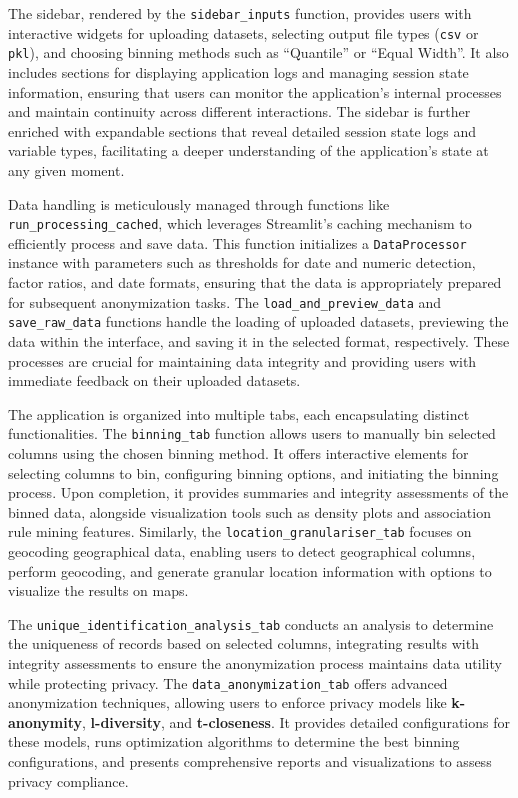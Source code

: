 \documentclass{article}
\begin{document}
The sidebar, rendered by the \texttt{sidebar\_inputs} function, provides users with interactive widgets for uploading datasets, selecting output file types (\texttt{csv} or \texttt{pkl}), and choosing binning methods such as ``Quantile'' or ``Equal Width''. It also includes sections for displaying application logs and managing session state information, ensuring that users can monitor the application's internal processes and maintain continuity across different interactions. The sidebar is further enriched with expandable sections that reveal detailed session state logs and variable types, facilitating a deeper understanding of the application's state at any given moment.

Data handling is meticulously managed through functions like \texttt{run\_processing\_cached}, which leverages Streamlit's caching mechanism to efficiently process and save data. This function initializes a \texttt{DataProcessor} instance with parameters such as thresholds for date and numeric detection, factor ratios, and date formats, ensuring that the data is appropriately prepared for subsequent anonymization tasks. The \texttt{load\_and\_preview\_data} and \texttt{save\_raw\_data} functions handle the loading of uploaded datasets, previewing the data within the interface, and saving it in the selected format, respectively. These processes are crucial for maintaining data integrity and providing users with immediate feedback on their uploaded datasets.

The application is organized into multiple tabs, each encapsulating distinct functionalities. The \texttt{binning\_tab} function allows users to manually bin selected columns using the chosen binning method. It offers interactive elements for selecting columns to bin, configuring binning options, and initiating the binning process. Upon completion, it provides summaries and integrity assessments of the binned data, alongside visualization tools such as density plots and association rule mining features. Similarly, the \texttt{location\_granulariser\_tab} focuses on geocoding geographical data, enabling users to detect geographical columns, perform geocoding, and generate granular location information with options to visualize the results on maps.

The \texttt{unique\_identification\_analysis\_tab} conducts an analysis to determine the uniqueness of records based on selected columns, integrating results with integrity assessments to ensure the anonymization process maintains data utility while protecting privacy. The \texttt{data\_anonymization\_tab} offers advanced anonymization techniques, allowing users to enforce privacy models like \textbf{k-anonymity}, \textbf{l-diversity}, and \textbf{t-closeness}. It provides detailed configurations for these models, runs optimization algorithms to determine the best binning configurations, and presents comprehensive reports and visualizations to assess privacy compliance.
\end{document}
